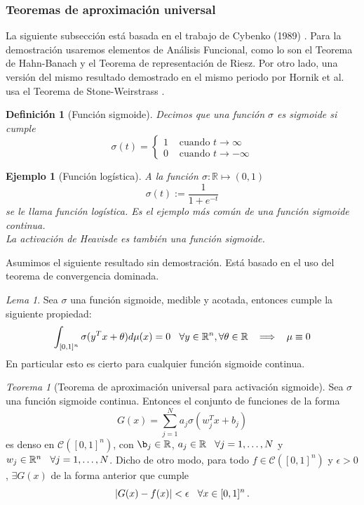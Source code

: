 \documentclass[letterpaper,11pt]{article} %
\def\espacio{\hspace{.25cm}\,}
\theoremstyle{defbreak}
\newtheorem{definition}{Definición}[subsection]
\newtheorem{example}{Ejemplo}[subsection]
\theoremstyle{propbreak}
\theoremstyle{remark}
\theoremstyle{break}
\newtheorem{theorem}{Teorema}[subsection]
\newtheorem{lemma}{Lema}[subsection]
\def\R{\mathbb{R}}
\begin{document}
\subsubsection{Teoremas de aproximación universal}
La siguiente subsección está basada en el trabajo de Cybenko (1989) \cite{cybenko}. Para la demostración usaremos elementos de Análisis Funcional, como lo son el Teorema de Hahn-Banach y el Teorema de representación de Riesz. Por otro lado, una versión del mismo resultado demostrado en el mismo periodo por Hornik et al. usa el Teorema de Stone-Weirstrass \cite{hornik}.
\begin{definition}[Función sigmoide]
Decimos que una función $\sigma$ es sigmoide si cumple
$$ \sigma(t) = \begin{cases}
1 & \text{ cuando }t\to\infty \\
0 & \text{ cuando }t\to-\infty
\end{cases}$$
\end{definition}
\begin{example}[Función logística]
A la función $\sigma:\R\mapsto (0,1)$
$$ \sigma(t):= \displaystyle\frac{1}{1+e^{-t}}$$
se le llama función logística. Es el ejemplo más común de una función sigmoide continua.
\\ La activación de Heavisde es también una función sigmoide.
\end{example}
Asumimos el siguiente resultado sin demostración. Está basado en el uso del teorema de convergencia dominada.
\begin{lemma}
\label{lemma:discrim}
Sea $\sigma$ una función sigmoide, medible y acotada, entonces cumple la siguiente propiedad:
$$ \int_{[0,1]^n}\sigma(y^Tx+\theta)d\mu(x)=0\espacio \forall y\in\R^n,\forall\theta \in\R\espacio \Longrightarrow \espacio  \mu\equiv 0$$
En particular esto es cierto para cualquier función sigmoide continua.
\end{lemma}
\begin{theorem}[Teorema de aproximación universal para activación sigmoide]
\label{teo:AU}
Sea $\sigma$ una función sigmoide continua. Entonces el conjunto de funciones de la forma
$$ G(x) = \displaystyle \sum^N_{j=1}a_j\sigma(w^T_jx+b_j)$$
es denso en $\mathcal{C}([0,1]^n)$, con $\b_j\in\R$, $a_j\in\R\espacio \forall j=1,\dots,N$ y $w_j\in\R^n\espacio\forall j=1,\dots,N$. Dicho de otro modo, para todo $f\in\mathcal{C}([0,1]^n)$ y $\epsilon>0$, $\exists G(x)$ de la forma anterior que cumple
$$ |G(x)-f(x)|<\epsilon\espacio\forall x\in [0,1]^n\,.$$
\end{theorem}
\end{document}
